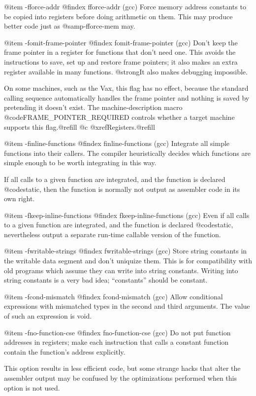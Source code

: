 {@item -fforce-addr
@findex fforce-addr (gcc)
Force memory address constants to be copied into registers before
doing arithmetic on them. This may produce better code just as
@samp{-fforce-mem} may.

@item -fomit-frame-pointer
@findex fomit-frame-pointer (gcc)
Don't keep the frame pointer in a register for functions that
don't need one.  This avoids the instructions to save, set up and
restore frame pointers; it also makes an extra register available
in many functions. @strong{It also makes debugging impossible.}

On some machines, such as the Vax, this flag has no effect,
because the standard calling sequence automatically handles the
frame pointer and nothing is saved by pretending it doesn't
exist.  The machine-description macro
@code{FRAME_POINTER_REQUIRED} controls whether a target machine
supports this flag.@refill
@c @xref{Registers}.@refill

@item -finline-functions
@findex finline-functions (gcc)
Integrate all simple functions into their callers. The compiler
heuristically decides which functions are simple enough to be
worth integrating in this way.

If all calls to a given function are integrated, and the function
is declared @code{static}, then the function is normally not
output as assembler code in its own right.

@item -fkeep-inline-functions
@findex fkeep-inline-functions (gcc)
Even if all calls to a given function are integrated, and the
function is declared @code{static}, nevertheless output a
separate run-time callable version of the function.

@item -fwritable-strings
@findex fwritable-strings (gcc)
Store string constants in the writable data segment and don't
uniquize them.  This is for compatibility with old programs which
assume they can write into string constants. Writing into string
constants is a very bad idea; ``constants'' should be constant.

@item -fcond-mismatch
@findex fcond-mismatch (gcc)
Allow conditional expressions with mismatched types in the second and
third arguments. The value of such an expression is void.

@item -fno-function-cse
@findex fno-function-cse (gcc)
Do not put function addresses in registers; make each instruction
that calls a constant function contain the function's address
explicitly.

This option results in less efficient code, but some strange
hacks that alter the assembler output may be confused by the
optimizations performed when this option is not used.

}
